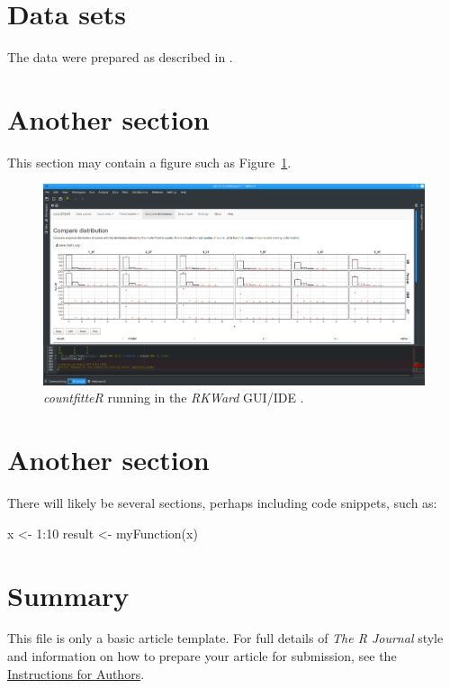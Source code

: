 \section{Data sets}

The data were prepared as described in \citep{rodiger_quantification_2018}.

\section{Another section}

This section may contain a figure such as Figure~\ref{figure:fig_gui}.

\begin{figure}[htbp]
  \centering
  \includegraphics[width=0.99\columnwidth]{fig_gui}
  \caption{\emph{countfitteR} running in the \emph{RKWard} GUI/IDE \citep{rodiger_rkward:_2012}.}
  \label{figure:fig_gui}
\end{figure}

\section{Another section}

There will likely be several sections, perhaps including code snippets, such as:

\begin{example}
  x <- 1:10
  result <- myFunction(x)
\end{example}


\section{Summary}

This file is only a basic article template. For full details of \emph{The R Journal} style and information on how to prepare your article for submission, see the \href{https://journal.r-project.org/share/author-guide.pdf}{Instructions for Authors}.

